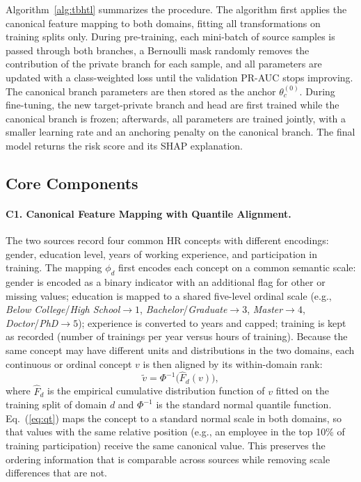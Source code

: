 \documentclass[runningheads]{llncs}
\begin{document}
Algorithm~\ref{alg:tbhtl} summarizes the procedure. The algorithm first applies the canonical feature mapping to both domains, fitting all transformations on training splits only. During pre-training, each mini-batch of source samples is passed through both branches, a Bernoulli mask randomly removes the contribution of the private branch for each sample, and all parameters are updated with a class-weighted loss until the validation PR-AUC stops improving. The canonical branch parameters are then stored as the anchor $\theta_c^{(0)}$. During fine-tuning, the new target-private branch and head are first trained while the canonical branch is frozen; afterwards, all parameters are trained jointly, with a smaller learning rate and an anchoring penalty on the canonical branch. The final model returns the risk score and its SHAP explanation.

\subsection{Core Components}
\paragraph{C1. Canonical Feature Mapping with Quantile Alignment.}
The two sources record four common HR concepts with different encodings: gender, education level, years of working experience, and participation in training. The mapping $\phi_d$ first encodes each concept on a common semantic scale: gender is encoded as a binary indicator with an additional flag for other or missing values; education is mapped to a shared five-level ordinal scale (e.g., \emph{Below College}/\emph{High School}$\to1$, \emph{Bachelor}/\emph{Graduate}$\to3$, \emph{Master}$\to4$, \emph{Doctor}/\emph{PhD}$\to5$); experience is converted to years and capped; training is kept as recorded (number of trainings per year versus hours of training). Because the same concept may have different units and distributions in the two domains, each continuous or ordinal concept $v$ is then aligned by its within-domain rank:
\begin{equation}\label{eq:qt}
\tilde{v}=\Phi^{-1}\!\big(\hat{F}_d(v)\big),
\end{equation}
where $\hat{F}_d$ is the empirical cumulative distribution function of $v$ fitted on the training split of domain $d$ and $\Phi^{-1}$ is the standard normal quantile function. Eq.~(\ref{eq:qt}) maps the concept to a standard normal scale in both domains, so that values with the same relative position (e.g., an employee in the top 10\% of training participation) receive the same canonical value. This preserves the ordering information that is comparable across sources while removing scale differences that are not.
\end{document}

